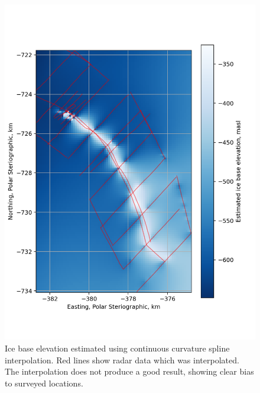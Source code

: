 \begin{figure}[ht!]
\includegraphics[width=1\textwidth]{chapters/2/gmt_surface_interp.png}
\caption[Ice base poor interpolation]{Ice base elevation estimated using continuous curvature spline interpolation. Red lines show radar data which was interpolated. The interpolation does not produce a good result, showing clear bias to surveyed locations.}
\label{fig:gmt_surface_interp}
\end{figure}

